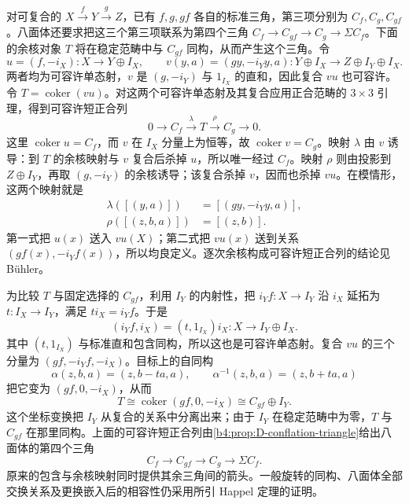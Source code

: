 \begin{proofsketch}
	对可复合的 \(X\xrightarrow{f}Y\xrightarrow{g}Z\)，已有 \(f,g,gf\) 各自的标准三角，第三项分别为 \(C_f,C_g,C_{gf}\)。八面体还要求把这三个第三项联系为第四个三角 \(C_f\to C_{gf}\to C_g\to\Sigma C_f\)。下面的余核对象 \(T\) 将在稳定范畴中与 \(C_{gf}\) 同构，从而产生这个三角。令
	\[
		u=(f,-i_X):X\longrightarrow Y\oplus I_X, \qquad v(y,a)=(gy,-i_Yy,a):Y\oplus I_X\longrightarrow Z\oplus I_Y\oplus I_X.
	\]
	两者均为可容许单态射，\(v\) 是 \((g,-i_Y)\) 与 \(1_{I_X}\) 的直和，因此复合 \(vu\) 也可容许。令 \(T=\operatorname{coker}(vu)\)。对这两个可容许单态射及其复合应用正合范畴的 \(3\times3\) 引理，得到可容许短正合列
	\[
		0\longrightarrow C_f\xrightarrow{\lambda}T \xrightarrow{\rho}C_g\longrightarrow0.
	\]
	这里 \(\operatorname{coker}u=C_f\)，而 \(v\) 在 \(I_X\) 分量上为恒等，故 \(\operatorname{coker}v=C_g\)。映射 \(\lambda\) 由 \(v\) 诱导：到 \(T\) 的余核映射与 \(v\) 复合后杀掉 \(u\)，所以唯一经过 \(C_f\)。映射 \(\rho\) 则由投影到 \(Z\oplus I_Y\)，再取 \((g,-i_Y)\) 的余核诱导；该复合杀掉 \(v\)，因而也杀掉 \(vu\)。在模情形，这两个映射就是
	\begin{align*}
		\lambda([(y,a)])&=[(gy,-i_Yy,a)],\\
		\rho([(z,b,a)])&=[(z,b)].
	\end{align*}
	第一式把 \(u(x)\) 送入 \(vu(X)\)；第二式把 \(vu(x)\) 送到关系 \((gf(x),-i_Yf(x))\)，所以均良定义。逐次余核构成可容许短正合列的结论见 Bühler\cite[Lemma 3.5; Corollary 3.6]{Buehler2010ExactCategories}。

	为比较 \(T\) 与固定选择的 \(C_{gf}\)，利用 \(I_Y\) 的内射性，把 \(i_Yf:X\to I_Y\) 沿 \(i_X\) 延拓为 \(t:I_X\to I_Y\)，满足 \(ti_X=i_Yf\)。于是
	\[
		(i_Yf,i_X)=(t,1_{I_X})i_X:X\longrightarrow I_Y\oplus I_X.
	\]
	其中 \((t,1_{I_X})\) 与标准直和包含同构，所以这也是可容许单态射。复合 \(vu\) 的三个分量为 \((gf,-i_Yf,-i_X)\)。目标上的自同构
	\[
		\alpha(z,b,a)=(z,b-ta,a), \qquad \alpha^{-1}(z,b,a)=(z,b+ta,a)
	\]
	把它变为 \((gf,0,-i_X)\)，从而
	\[
		T\cong\operatorname{coker}(gf,0,-i_X) \cong C_{gf}\oplus I_Y.
	\]
	这个坐标变换把 \(I_Y\) 从复合的关系中分离出来；由于 \(I_Y\) 在稳定范畴中为零，\(T\) 与 \(C_{gf}\) 在那里同构。上面的可容许短正合列由\cref{b4:prop:D-conflation-triangle}给出八面体的第四个三角
	\[
		C_f\longrightarrow C_{gf}\longrightarrow C_g\longrightarrow\Sigma C_f.
	\]
	原来的包含与余核映射同时提供其余三角间的箭头。一般旋转的同构、八面体全部交换关系及更换嵌入后的相容性仍采用所引 Happel 定理的证明。
\end{proofsketch}


